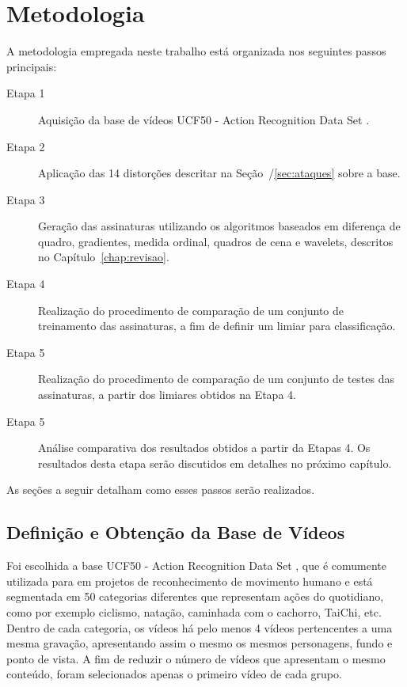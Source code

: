 
\chapter{Metodologia}
\label{chap:metodologia}


A metodologia empregada neste trabalho está organizada nos seguintes passos principais:

\begin{description}
\item[Etapa 1] Aquisição da base de vídeos UCF50 - Action Recognition Data Set \citeauthor{reddy2013recognizing}.
\item[Etapa 2] Aplicação das 14 distorções descritar na Seção~/\ref{sec:ataques} sobre a base.
\item[Etapa 3] Geração das assinaturas utilizando os algoritmos baseados em diferença de quadro, gradientes, medida ordinal, quadros de cena e wavelets, descritos no Capítulo~\ref{chap:revisao}.
\item[Etapa 4] Realização do procedimento de comparação de um conjunto de treinamento das assinaturas, a fim de definir um limiar para classificação.
\item[Etapa 5] Realização do procedimento de comparação de um conjunto de testes das assinaturas, a partir dos limiares obtidos na Etapa 4.
\item[Etapa 5] Análise comparativa dos resultados obtidos a partir da Etapas 4. Os resultados desta etapa serão discutidos em detalhes no próximo capítulo.
\end{description}

As seções a seguir detalham como esses passos serão realizados.

\section{Definição e Obtenção da Base de Vídeos}
\label{sec:database}

Foi escolhida a base UCF50 - Action Recognition Data Set \citeauthor{reddy2013recognizing}, que é comumente utilizada para em projetos de reconhecimento de movimento humano e está segmentada em 50 categorias diferentes que representam ações do quotidiano, como por exemplo ciclismo, natação, caminhada com o cachorro, TaiChi, etc. Dentro de cada categoria, os vídeos há pelo menos 4 vídeos pertencentes a uma mesma gravação, apresentando assim o mesmo os mesmos personagens, fundo e ponto de vista. A fim de reduzir o número de vídeos que apresentam o mesmo conteúdo, foram selecionados apenas o primeiro vídeo de cada grupo.

